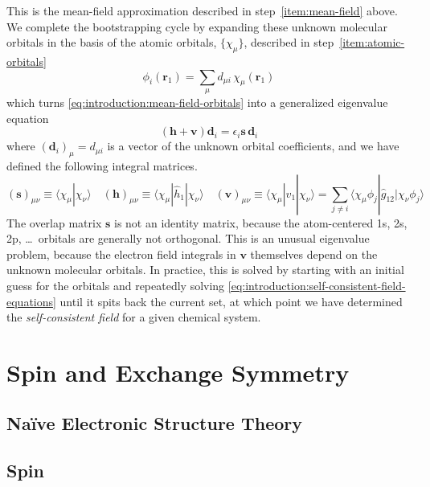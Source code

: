 This is the mean-field approximation described in step~\ref{item:mean-field}
above.
We complete the bootstrapping cycle by expanding these unknown molecular
orbitals in the basis of the atomic orbitals, \(\{\chi_\mu\}\), described in
step~\ref{item:atomic-orbitals}
\begin{equation}
    \phi_i(\mathbf{r}_1)
    =
    \sum_\mu
    d_{\mu i}\,
    \chi_\mu(\mathbf{r}_1)
\end{equation}
which turns \cref{eq:introduction:mean-field-orbitals} into a generalized
eigenvalue equation
\begin{equation}
    \label{eq:introduction:self-consistent-field-equations}
    (
        \mathbf{h}
        +
        \mathbf{v}
    )
    \mathbf{d}_i
    =
    \epsilon_i
    \mathbf{s}\,
    \mathbf{d}_i
\end{equation}
where \((\mathbf{d}_i)_\mu=d_{\mu i}\) is a vector of the unknown orbital
coefficients, and we have defined the following integral matrices.
\begin{equation}
    (\mathbf{s})_{\mu\nu}
    \equiv
    \langle\chi_\mu|\chi_\nu\rangle
    \quad
    (\mathbf{h})_{\mu\nu}
    \equiv
    \langle\chi_\mu|\hat{h}_1|\chi_\nu\rangle
    \quad
    (\mathbf{v})_{\mu\nu}
    \equiv
    \langle\chi_\mu|\hat{v}_1|\chi_\nu\rangle
    =
    \sum_{j\neq i}
    \langle\chi_\mu\phi_j|\hat{g}_{12}|\chi_\nu\phi_j\rangle
\end{equation}
The overlap matrix \(\mathbf{s}\) is not an identity matrix, because the
atom-centered 1s, 2s, 2p, \dots\ orbitals are generally not orthogonal.
This is an unusual eigenvalue problem, because the electron field integrals in
\(\mathbf{v}\) themselves depend on the unknown molecular orbitals.
In practice, this is solved by starting with an initial guess for the orbitals
and repeatedly solving \cref{eq:introduction:self-consistent-field-equations}
until it spits back the current set, at which point we have determined the
{\itshape self-consistent field} for a given chemical system.


\section{Spin and Exchange Symmetry}


\subsection{Na\"ive Electronic Structure Theory}

\subsection{Spin}

